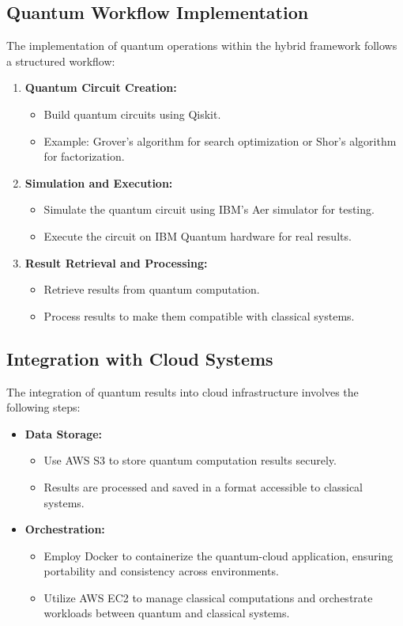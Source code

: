 \documentclass[conference]{IEEEtran}
\begin{document}
\subsection{Quantum Workflow Implementation}
The implementation of quantum operations within the hybrid framework follows a structured workflow:
\begin{enumerate}
    \item \textbf{Quantum Circuit Creation:}
    \begin{itemize}
        \item Build quantum circuits using Qiskit.
        \item Example: Grover's algorithm for search optimization or Shor's algorithm for factorization.
    \end{itemize}
    \item \textbf{Simulation and Execution:}
    \begin{itemize}
        \item Simulate the quantum circuit using IBM's Aer simulator for testing.
        \item Execute the circuit on IBM Quantum hardware for real results.
    \end{itemize}
    \item \textbf{Result Retrieval and Processing:}
    \begin{itemize}
        \item Retrieve results from quantum computation.
        \item Process results to make them compatible with classical systems.
    \end{itemize}
\end{enumerate}

\subsection{Integration with Cloud Systems}
The integration of quantum results into cloud infrastructure involves the following steps:
\begin{itemize}
    \item \textbf{Data Storage:}
    \begin{itemize}
        \item Use AWS S3 to store quantum computation results securely.
        \item Results are processed and saved in a format accessible to classical systems.
    \end{itemize}
    \item \textbf{Orchestration:}
    \begin{itemize}
        \item Employ Docker to containerize the quantum-cloud application, ensuring portability and consistency across environments.
        \item Utilize AWS EC2 to manage classical computations and orchestrate workloads between quantum and classical systems.
    \end{itemize}
\end{itemize}
\end{document}
